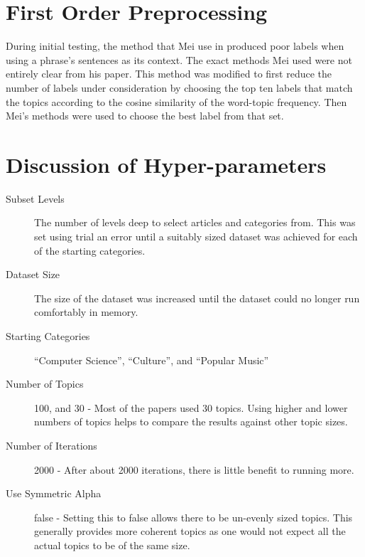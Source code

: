 \section{First Order Preprocessing}
During initial testing, the method that Mei use in \cite{mei2007automatic} produced poor labels when using a phrase's sentences as its context.  The exact methods Mei used were not entirely clear from his paper.  This method was modified to first reduce the number of labels under consideration by choosing the top ten labels that match the topics according to the cosine similarity of the word-topic frequency.  Then Mei's methods were used to choose the best label from that set.

\section{Discussion of Hyper-parameters}
\label{section:methods-hyper}

\begin{description}
\item [Subset Levels] The number of levels deep to select articles and categories from.  This was set using trial an error until a suitably sized dataset was achieved for each of the starting categories.
\item [Dataset Size] The size of the dataset was increased until the dataset could no longer run comfortably in memory.  
\item [Starting Categories] ``Computer Science'', ``Culture'', and ``Popular Music''
\item [Number of Topics] 100, and 30 - Most of the papers used 30 topics.  Using higher and lower numbers of topics helps to compare the results against other topic sizes.
\item [Number of Iterations] 2000 - After about 2000 iterations, there is little benefit to running more.
\item [Use Symmetric Alpha] false - Setting this to false allows there to be un-evenly sized topics.  This generally provides more coherent topics as one would not expect all the actual topics to be of the same size.
\end{description}

